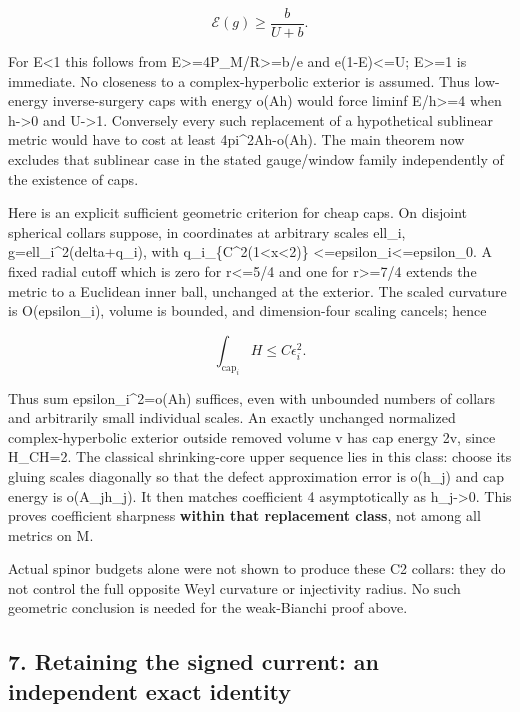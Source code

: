 \documentclass[
  10pt,
]{article}
\begin{document}
\[
                         \mathcal E(g)\ge\frac b{U+b}.
                                                               \tag{6.2}
\]

For E\textless1 this follows from E\textgreater=4P\_M/R\textgreater=b/e
and e(1-E)\textless=U; E\textgreater=1 is immediate. No closeness to a
complex-hyperbolic exterior is assumed. Thus low-energy inverse-surgery
caps with energy o(Ah) would force liminf E/h\textgreater=4 when
h-\textgreater0 and U-\textgreater1. Conversely every such replacement
of a hypothetical sublinear metric would have to cost at least
4pi\^{}2Ah-o(Ah). The main theorem now excludes that sublinear case in
the stated gauge/window family independently of the existence of caps.

Here is an explicit sufficient geometric criterion for cheap caps. On
disjoint spherical collars suppose, in coordinates at arbitrary scales
ell\_i, g=ell\_i\^{}2(delta+q\_i), with
\textbar\textbar q\_i\textbar\textbar\_\{C\^{}2(1\textless\textbar x\textbar\textless2)\}
\textless=epsilon\_i\textless=epsilon\_0. A fixed radial cutoff which is
zero for r\textless=5/4 and one for r\textgreater=7/4 extends the metric
to a Euclidean inner ball, unchanged at the exterior. The scaled
curvature is O(epsilon\_i), volume is bounded, and dimension-four
scaling cancels; hence

\[
                         \int_{\mathrm{cap}_i}H\le C\epsilon_i^2.
                                                               \tag{6.3}
\]

Thus sum epsilon\_i\^{}2=o(Ah) suffices, even with unbounded numbers of
collars and arbitrarily small individual scales. An exactly unchanged
normalized complex-hyperbolic exterior outside removed volume v has cap
energy 2v, since H\_CH=2. The classical shrinking-core upper sequence
lies in this class: choose its gluing scales diagonally so that the
defect approximation error is o(h\_j) and cap energy is o(A\_jh\_j). It
then matches coefficient 4 asymptotically as h\_j-\textgreater0. This
proves coefficient sharpness \textbf{within that replacement class}, not
among all metrics on M.

Actual spinor budgets alone were not shown to produce these C2 collars:
they do not control the full opposite Weyl curvature or injectivity
radius. No such geometric conclusion is needed for the weak-Bianchi
proof above.

\hypertarget{retaining-the-signed-current-an-independent-exact-identity}{%
\subsection{7. Retaining the signed current: an independent exact
identity}\label{retaining-the-signed-current-an-independent-exact-identity}}
\end{document}
